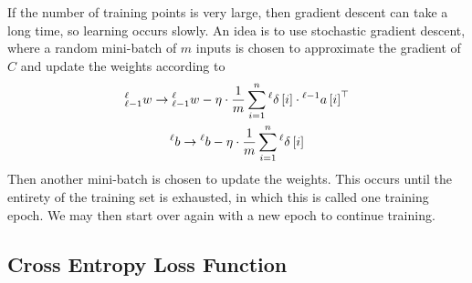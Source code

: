 \documentclass[11pt]{report} %
\begin{document}
If the number of training points is very large, then gradient descent can take a long time, so learning occurs slowly. An idea is to use stochastic gradient descent, where a random mini-batch of $m$ inputs is chosen to approximate the gradient of $C$ and update the weights according to
\begin{gather}
\mathstrut_{\ell-1}^{\ell}w\rightarrow\mathstrut_{\ell-1}^{\ell}w-\eta\cdot\dfrac{1}{m}\sum_{i=1}^{n}\mathstrut^{\ell}\delta\left[i\right]\cdot\mathstrut^{\ell-1}a\left[i\right]^{\top} \\
\mathstrut^{\ell}b\rightarrow\mathstrut^{\ell}b-\eta\cdot\dfrac{1}{m}\sum_{i=1}^{n}\mathstrut^{\ell}\delta\left[i\right]
\end{gather}
Then another mini-batch is chosen to update the weights. This occurs until the entirety of the training set is exhausted, in which this is called one training epoch. We may then start over again with a new epoch to continue training.

\subsection{Cross Entropy Loss Function}
\end{document}
